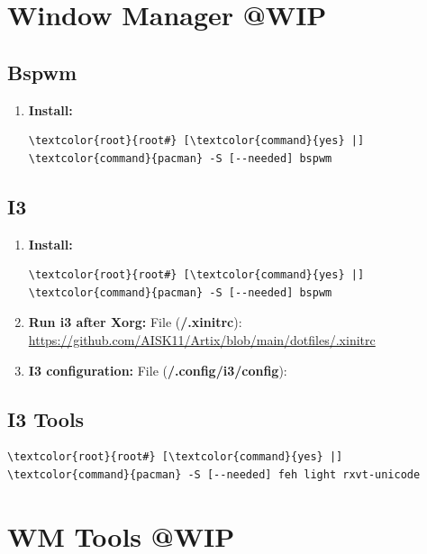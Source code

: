 \documentclass[10pt, a4paper, onecolumn, oneside, titlepage, openany]{book}
\begin{document}
\chapter{Window Manager @WIP}
\section{Bspwm}
\begin{enumerate}
    \item \textbf{Install:}
\begin{Verbatim}[commandchars=\\\{\}]
\textcolor{root}{root#} [\textcolor{command}{yes} |] \textcolor{command}{pacman} -S [--needed] bspwm
\end{Verbatim}
\end{enumerate}


\section{I3}
\begin{enumerate}
    \item \textbf{Install:}
\begin{Verbatim}[commandchars=\\\{\}]
\textcolor{root}{root#} [\textcolor{command}{yes} |] \textcolor{command}{pacman} -S [--needed] bspwm
\end{Verbatim}
    \item \textbf{Run i3 after Xorg:}
\newline File (\textbf{\textcolor{file}{\texttildelow/.xinitrc}}):
\newline \url{https://github.com/AISK11/Artix/blob/main/dotfiles/.xinitrc}
    \item \textbf{I3 configuration:}
\newline File (\textbf{\textcolor{file}{\texttildelow/.config/i3/config}}):
\newline \url{}    
\end{enumerate}
\section{I3 Tools}
\begin{Verbatim}[commandchars=\\\{\}]
\textcolor{root}{root#} [\textcolor{command}{yes} |] \textcolor{command}{pacman} -S [--needed] feh light rxvt-unicode
\end{Verbatim}


\chapter{WM Tools @WIP}
\end{document}
